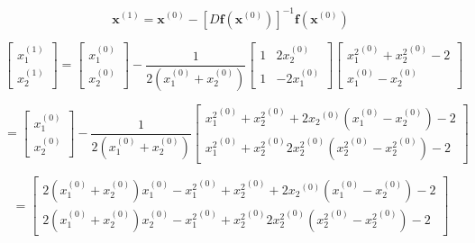 \documentclass[00-main.tex]{subfiles}
\begin{document}
\begin{equation}
\mathbf{x}^{(1)} = \mathbf{x}^{(0)} - \left[D\mathbf{f}(\mathbf{x}^{(0)})\right]^{-1} \mathbf{f} (\mathbf{x}^{(0)})
\end{equation}

\begin{equation}
\left[ 	
	\begin{array}{cc} 
		x_1^{(1)} \\ 
		x_2^{(1)}
	\end{array} 
\right] 
=
\left[ 	
	\begin{array}{cc} 
		x_1^{(0)} \\ 
		x_2^{(0)}  
	\end{array} 
\right] 
-
\frac{1}{2(x_1^{(0)} + x_2^{(0)})} 
\left[ 	
	\begin{array}{cc} 
		1 & 2x_2^{(0)} \\ 
		1 & -2x_1^{(0)}  
	\end{array} 
\right] 
\left[ 	
	\begin{array}{cc} 
		{x_1^{2}}^{(0)} + {x_2^2}^{(0)} - 2 \\ 
		x_1^{(0)} - x_2^{(0)}  
	\end{array} 
\right] 
\end{equation}

\begin{equation}
=
\left[ 	
	\begin{array}{cc} 
		x_1^{(0)} \\ 
		x_2^{(0)}  
	\end{array} 
\right] 
-
\frac{1}{2(x_1^{(0)} + x_2^{(0)})} 
\left[ 	
	\begin{array}{cc} 
		{x_1^{2}}^{(0)} + {x_2^2}^{(0)} + 2{x_2}^{(0)}(x_1^{(0)}-x_2^{(0)}) - 2 \\ 
		{x_1^{2}}^{(0)} + {x_2^2}^{(0)} 2{x_2^2}^{(0)}({x_2^2}^{(0)}-{x_2^2}^{(0)}) - 2 
	\end{array}
\right] 
\end{equation}

\begin{equation}
=
\left[ 	
	\begin{array}{cc} 
		2(x_1^{(0)} + x_2^{(0)})x_1^{(0)} - {x_1^{2}}^{(0)} + {x_2^2}^{(0)} + 2{x_2}^{(0)}(x_1^{(0)}-x_2^{(0)}) - 2 \\ 
		2(x_1^{(0)} + x_2^{(0)})x_2^{(0)} - {x_1^{2}}^{(0)} + {x_2^2}^{(0)} 2{x_2^2}^{(0)}({x_2^2}^{(0)}-{x_2^2}^{(0)}) - 2 
	\end{array}
\right] 
\end{equation}
\end{document}
